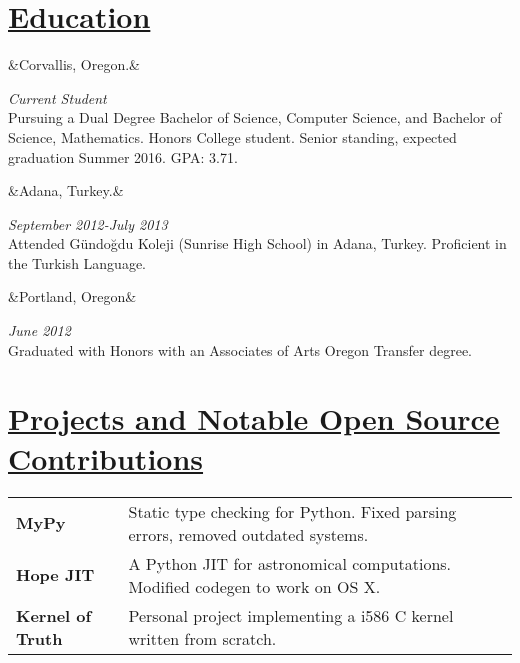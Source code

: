 \documentclass[11pt]{article}
\newcommand{\heading}[1]{
    \section*{\uline{#1 \hfill}}
}
\newcommand{\squish}{
    \setlength{\itemsep}{0.5pt}
    \setlength{\parskip}{0pt}
    \setlength{\parsep}{0.5pt}
}
\newcommand{\when}[1]{
    \hfill \emph{#1}
}
\newcommand{\experience}[3]{
    \ifx&#2&
        \item[{#1}]
    \else
        \item[{#1}, \emph{#2}]
    \fi
    \when{#3}\\
}
\begin{document}
\heading{Education}
\squish
\begin{description}
\squish
	\experience{Oregon State University}
	           {Corvallis, Oregon.}
			   {Current Student}
		Pursuing a Dual Degree Bachelor of Science, Computer Science,
		and Bachelor of Science, Mathematics.
		Honors College student. Senior standing, expected graduation Summer
		2016.  GPA: 3.71.

	\experience{AFS Turkey Foreign Exchange Program}
               {Adana, Turkey.}
			   {September 2012-July 2013}
		Attended G{\" u}ndo{\u g}du Koleji (Sunrise High School) in Adana,
		Turkey. Proficient in the Turkish Language.

	\experience{Portland Community College}
	           {Portland, Oregon}
			   {June 2012}
		Graduated with Honors with an Associates of Arts
		Oregon Transfer degree.
\end{description}

\heading{Projects and Notable Open Source Contributions}
\begin{tabular}{ p{3cm} p{12cm}}
\textbf{MyPy} & Static type checking for Python. Fixed parsing errors,
	removed outdated systems. \\
\textbf{Hope JIT} & A Python JIT for astronomical computations. Modified codegen
to work on OS X. \\
\textbf{Kernel of Truth} & Personal project implementing a i586 C kernel written
	from scratch. \\
\end{tabular}
\end{document}
